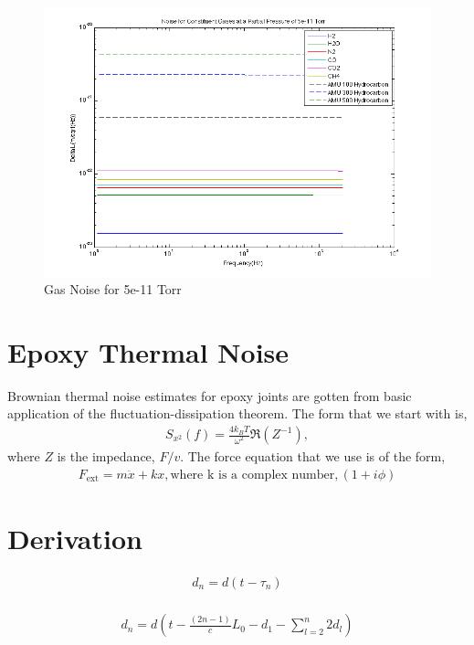 \begin{figure}[htbp]
	\centering
		\includegraphics[width=15cm]{./figures/trapgasnoise_2.png}
	\caption[Gas Noise Comparison]{Gas Noise for 5e-11 Torr}
	\label{fig:gas_noise2}
\end{figure}

\section{Epoxy Thermal Noise}

Brownian thermal noise estimates for epoxy joints are gotten from basic application of the fluctuation-dissipation theorem. The form that we start with is,
\begin{align*}
S_{x^2}(f) = \frac{4 k_B T}{\omega^2} \Re(Z^{-1}), 
\end{align*}
where $Z$ is the impedance, $F / v$. The force equation that we use is of the form,
\begin{align*}
F_{\mathrm{ext}} = m \ddot{x} + k x,
\text{where k is a complex number}, (1 + i \phi)
\end{align*}

\section{Derivation}

\begin{align*}
d_n = d(t-\tau_n)
\end{align*} \\

\begin{align*}
d_n = d \left( t - \frac{(2n -1)}{c} L_0 - d_1 - \sum_{l=2}^{n} 2 d_l \right)
\end{align*} \\

